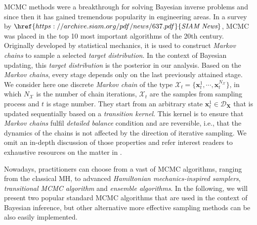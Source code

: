 \acrshort{MCMC} methods were a breakthrough for solving Bayesian inverse problems and since then it has gained tremendous popularity in engineering areas. In a survey by $\href{https://archive.siam.org/pdf/news/637.pdf}{\textit{SIAM News}}$, \acrshort{MCMC} was placed in the top 10 most important algorithms of the 20th century. Originally developed by statistical mechanics, it is used to construct \textit{Markov chains} to sample a selected \textit{target distribution}. In the context of Bayesian updating, this \textit{target distribution} is the posterior in our analysis. Based on the \textit{Markov chains}, every stage depends only on the last previously attained stage. We consider here one discrete \textit{Markov chain} of the type $\mathcal{X}_{t} =\{\boldsymbol{x}_{t}^{1},\cdots,\boldsymbol{x}_{t}^{N_{\mathcal{X}}}\}$, in which $N_{\mathcal{X}}$ is the number of chain iterations, $\mathcal{X}_{t}$ are the samples from sampling process and $t$ is stage number. They start from an arbitrary state $\boldsymbol{x}_{t}^{1} \in \mathcal{D}_{\bm{X}}$ that is updated sequentially based on a \textit{transition kernel}. This kernel is to ensure that \textit{Markov chains} fulfil \textit{detailed balance} condition and are reversible, i.e., that the dynamics of the chains is not affected by the direction of iterative sampling. We omit an in-depth discussion of those properties and refer interest readers to exhaustive resources on the matter in \cite{murphy2012}.

Nowadays, practitioners can choose from a vast of \acrshort{MCMC} algorithms, ranging from the classical \acrfull{MH}, to advanced \textit{Hamiltonian mechanics-inspired samplers}, \textit{transitional MCMC algorithm} and \textit{ensemble algorithms}. In the following, we will present two popular standard \acrshort{MCMC} algorithms that are used in the context of Bayesian inference, but other alternative more effective sampling methods can be also easily implemented.
